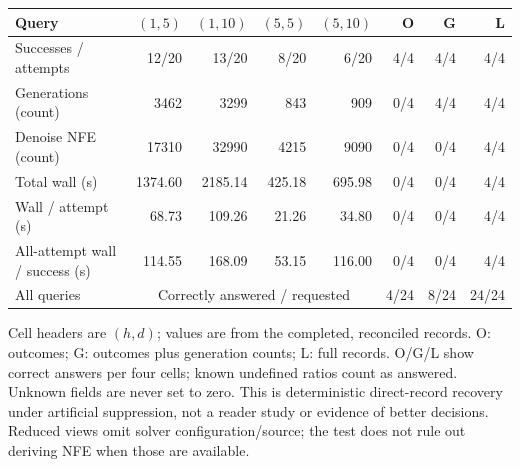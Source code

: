 \begingroup\scriptsize\setlength{\tabcolsep}{3pt}
\begin{tabular}{lrrrrrrr}
\toprule
Query & $(1,5)$ & $(1,10)$ & $(5,5)$ & $(5,10)$ & O & G & L\\
\midrule
Successes / attempts & 12/20 & 13/20 & 8/20 & 6/20 & 4/4 & 4/4 & 4/4\\
Generations (count) & 3462 & 3299 & 843 & 909 & 0/4 & 4/4 & 4/4\\
Denoise NFE (count) & 17310 & 32990 & 4215 & 9090 & 0/4 & 0/4 & 4/4\\
Total wall (s) & 1374.60 & 2185.14 & 425.18 & 695.98 & 0/4 & 0/4 & 4/4\\
Wall / attempt (s) & 68.73 & 109.26 & 21.26 & 34.80 & 0/4 & 0/4 & 4/4\\
All-attempt wall / success (s) & 114.55 & 168.09 & 53.15 & 116.00 & 0/4 & 0/4 & 4/4\\
\midrule
All queries & \multicolumn{4}{c}{Correctly answered / requested} & 4/24 & 8/24 & 24/24\\
\bottomrule
\end{tabular}\endgroup
\par\smallskip
{\footnotesize Cell headers are $(h,d)$; values are from the completed, reconciled records. O: outcomes; G: outcomes plus generation counts; L: full records. O/G/L show correct answers per four cells; known undefined ratios count as answered. Unknown fields are never set to zero. This is deterministic direct-record recovery under artificial suppression, not a reader study or evidence of better decisions. Reduced views omit solver configuration/source; the test does not rule out deriving NFE when those are available.}

